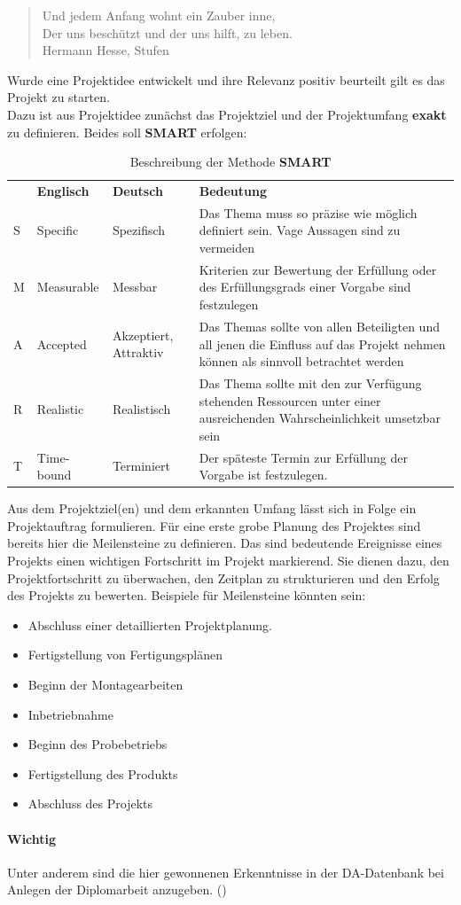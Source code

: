 \renewcommand*{\authorOfNextLines}{Helmut Quinz}
\begin{quote}
	Und jedem Anfang wohnt ein Zauber inne,\\
	Der uns beschützt und der uns hilft, zu leben.\\
	\small{Hermann Hesse, Stufen}
\end{quote}
Wurde eine Projektidee entwickelt und ihre Relevanz positiv beurteilt gilt es das Projekt zu starten.\\
Dazu ist aus Projektidee zunächst das Projektziel und der Projektumfang \textbf{exakt} zu definieren.
Beides soll \textbf{SMART} erfolgen:
\begin {table} [ht]
\begin{tabular}{p{5mm}p{22mm}p{20mm}p{97mm}}
		& \textbf{Englisch}	& \textbf{Deutsch} 	& \textbf{Bedeutung}\\
	S	& Specific			& Spezifisch		& Das Thema muss so präzise wie möglich definiert sein. Vage Aussagen sind zu vermeiden\\
	M	& Measurable		& Messbar			& Kriterien zur Bewertung der Erfüllung oder des Erfüllungsgrads einer Vorgabe sind festzulegen\\
	A	& Accepted			& Akzeptiert, Attraktiv
												& Das Themas sollte von allen Beteiligten und all jenen die Einfluss auf das Projekt nehmen können als sinnvoll betrachtet werden\\
	R	& Realistic			& Realistisch		& Das Thema sollte mit den zur Verfügung stehenden Ressourcen unter einer ausreichenden Wahrscheinlichkeit umsetzbar sein\\
	T	& Time-bound		& Terminiert		& Der späteste Termin zur Erfüllung der Vorgabe ist festzulegen.
\end{tabular}
\unstretchTableRows
\caption {Beschreibung der Methode \textbf{SMART}}
\end {table}
\FloatBarrier
Aus dem Projektziel(en) und dem erkannten Umfang lässt sich in Folge ein Projektauftrag formulieren.
Für eine erste grobe Planung des Projektes sind bereits hier die Meilensteine zu definieren.
Das sind bedeutende Ereignisse eines Projekts einen wichtigen Fortschritt im Projekt markierend.
Sie dienen dazu, den Projektfortschritt zu überwachen, den Zeitplan zu strukturieren und den Erfolg des Projekts zu bewerten. 
Beispiele für Meilensteine könnten sein:
\begin{itemize}
	\item Abschluss einer detaillierten Projektplanung.
	\item Fertigstellung von Fertigungsplänen
	\item Beginn der Montagearbeiten
	\item Inbetriebnahme
	\item Beginn des Probebetriebs
	\item Fertigstellung des Produkts
	\item Abschluss des Projekts
\end{itemize}
\paragraph{Wichtig} Unter anderem sind die hier gewonnenen Erkenntnisse in der DA-Datenbank bei Anlegen der Diplomarbeit anzugeben.
()